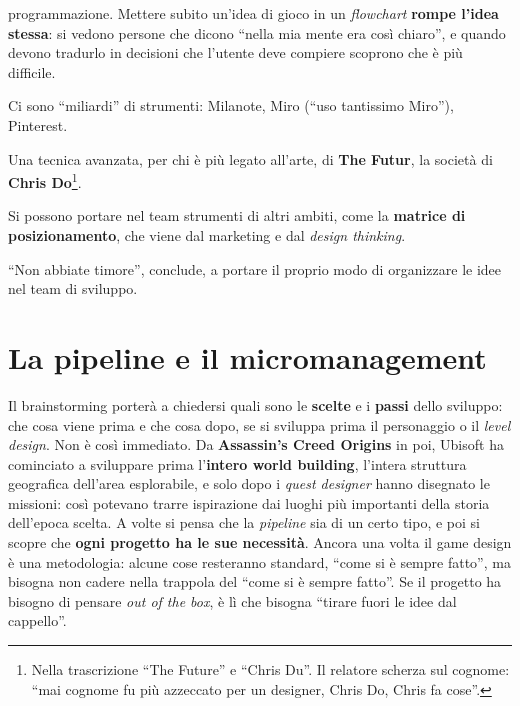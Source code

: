 \begin{description}
        programmazione. Mettere subito un'idea di gioco in un \emph{flowchart}
        \textbf{rompe l'idea stessa}: si vedono persone che dicono ``nella mia
        mente era così chiaro'', e quando devono tradurlo in decisioni che
        l'utente deve compiere scoprono che è più difficile.
  \item[Lavagne e raccolte visive.] Ci sono ``miliardi'' di strumenti:
        Milanote, Miro (``uso tantissimo Miro''), Pinterest.
  \item[\emph{Stylescape}.] Una tecnica avanzata, per chi è più legato all'arte,
        di \textbf{The Futur}, la società di \textbf{Chris Do}\footnote{Nella
        trascrizione ``The Future'' e ``Chris Du''. Il relatore scherza sul
        cognome: ``mai cognome fu più azzeccato per un designer, Chris Do, Chris
        fa cose''.}.
  \item[Strumenti dal marketing.] Si possono portare nel team strumenti di altri
        ambiti, come la \textbf{matrice di posizionamento}, che viene dal
        marketing e dal \emph{design thinking}.
\end{description}
``Non abbiate timore'', conclude, a portare il proprio modo di organizzare le
idee nel team di sviluppo.

\section{La pipeline e il micromanagement}
\label{sec:z6-pipeline}

Il brainstorming porterà a chiedersi quali sono le \textbf{scelte} e i
\textbf{passi} dello sviluppo: che cosa viene prima e che cosa dopo, se si
sviluppa prima il personaggio o il \emph{level design}. Non è così immediato.
Da \textbf{Assassin's Creed Origins} in poi, Ubisoft ha cominciato a sviluppare
prima l'\textbf{intero world building}, l'intera struttura geografica dell'area
esplorabile, e solo dopo i \emph{quest designer} hanno disegnato le missioni:
così potevano trarre ispirazione dai luoghi più importanti della storia
dell'epoca scelta. A volte si pensa che la \emph{pipeline} sia di un certo tipo,
e poi si scopre che \textbf{ogni progetto ha le sue necessità}. Ancora una volta
il game design è una metodologia: alcune cose resteranno standard, ``come si è
sempre fatto'', ma bisogna non cadere nella trappola del ``come si è sempre
fatto''. Se il progetto ha bisogno di pensare \emph{out of the box}, è lì che
bisogna ``tirare fuori le idee dal cappello''.

